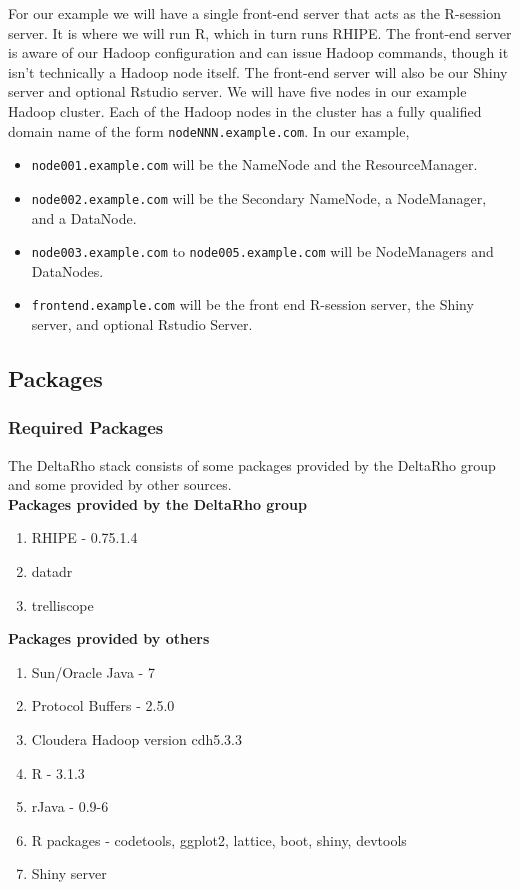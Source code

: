 For our example we will have a single front-end server that acts as the
R-session server.  It is where we will run R, which in turn runs RHIPE.
The front-end server is aware of our Hadoop configuration and can issue
Hadoop commands, though it isn't technically a Hadoop node itself. The
front-end server will also be our Shiny server and optional Rstudio
server.  We will have five nodes in our example Hadoop cluster.  Each of
the Hadoop nodes in the cluster has a fully qualified domain
name of the form \verb|nodeNNN.example.com|. In our example,

\begin{itemize}
\item \verb|node001.example.com| will be the NameNode and the ResourceManager.
\item \verb|node002.example.com| will be the Secondary NameNode, a NodeManager, and a DataNode.
\item \verb|node003.example.com| to \verb|node005.example.com| will be NodeManagers and DataNodes.
\item \verb|frontend.example.com| will be the front end R-session server, the Shiny server, and optional Rstudio Server.
\end{itemize}

\subsection{Packages}
\subsubsection{Required Packages}
The DeltaRho stack consists of some packages provided by the DeltaRho group and some provided by other sources. \\

\textbf{Packages provided by the DeltaRho group}
\begin{enumerate}
\item RHIPE - 0.75.1.4
\item datadr
\item trelliscope
\end{enumerate}
\textbf{Packages provided by others}
\begin{enumerate}
\item Sun/Oracle Java - 7
\item Protocol Buffers - 2.5.0
\item Cloudera Hadoop version cdh5.3.3
\item R - 3.1.3
\item rJava - 0.9-6
\item R packages - codetools, ggplot2, lattice, boot, shiny, devtools
\item Shiny server
\end{enumerate}

